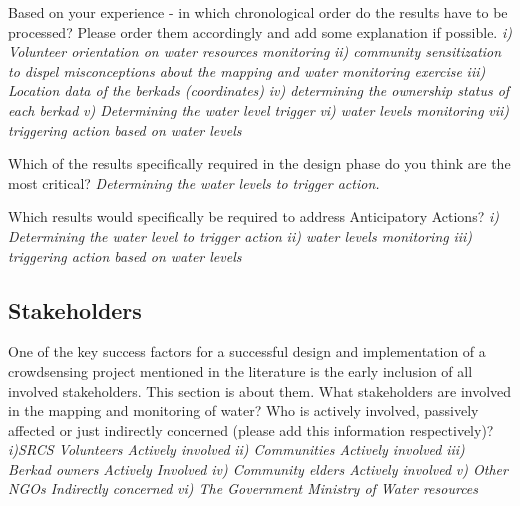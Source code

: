 Based on your experience - in which chronological order do the results have to be processed? Please order them accordingly and add some explanation if possible.\newline
\textit{i) Volunteer orientation on water resources monitoring}\newline
\textit{ii) community sensitization to dispel misconceptions about the mapping and water monitoring exercise}\newline
\textit{iii) Location data of the berkads (coordinates)}\newline
\textit{iv) determining the ownership status of each berkad}\newline
\textit{v) Determining the water level trigger}\newline
\textit{vi) water levels monitoring}\newline
\textit{vii) triggering action based on water levels}\newline

Which of the results specifically required in the design phase do you think are the most critical?\newline
\textit{Determining the water levels to trigger action.}

Which results would specifically be required to address Anticipatory Actions?\newline
\textit{i) Determining the water level to trigger action}\newline
\textit{ii) water levels monitoring}\newline
\textit{iii) triggering action based on water levels}\newline

\subsection*{Stakeholders}
One of the key success factors for a successful design and implementation of a crowdsensing project mentioned in the literature is the early inclusion of all involved stakeholders. This section is about them.
What stakeholders are involved in the mapping and monitoring of water? Who is actively involved, passively affected or just indirectly concerned (please add this information respectively)?\newline
\textit{i)SRCS Volunteers Actively involved}\newline
\textit{ii) Communities Actively involved}\newline
\textit{iii) Berkad owners Actively Involved}\newline
\textit{iv) Community elders Actively involved}\newline
\textit{v) Other NGOs Indirectly concerned}\newline
\textit{vi) The Government Ministry of Water resources}\newline

